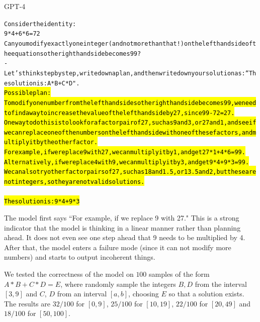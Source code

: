 \begin{AIbox}{GPT-4}
\scriptsize
\parbox{1\textwidth}{
\begin{alltt}
Consider the identity: \\
9 * 4 + 6 * 6 = 72 \\
Can you modify exactly one integer (and not more than that!) on the left hand side of the equation so the right hand side becomes 99? \\
-Let's think step by step, write down a plan, and then write down your solution as: ``The solution is: A*B+C*D". \\

\hl{Possible plan: \\
To modify one number from the left hand side so the right hand side becomes 99, we need to find a way to increase the value of the left hand side by 27, since 99 - 72 = 27. \\
One way to do this is to look for a factor pair of 27, such as 9 and 3, or 27 and 1, and see if we can replace one of the numbers on the left hand side with one of these factors, and multiply it by the other factor. \\
For example, if we replace 9 with 27, we can multiply it by 1, and get 27 * 1 + 4 * 6 = 99. \\
Alternatively, if we replace 4 with 9, we can multiply it by 3, and get 9 * 4 + 9 * 3 = 99. \\
We can also try other factor pairs of 27, such as 18 and 1.5, or 13.5 and 2, but these are not integers, so they are not valid solutions. \\ \\
The solution is: 9 * 4 + 9 * 3 }
\end{alltt}
}
\end{AIbox}

The model first says ``For example, if we replace 9 with 27."  This is a strong indicator that the model is thinking in a linear manner rather than planning ahead. It does not even see one step ahead that 9 needs to be multiplied by 4. After that, the model enters a failure mode (since it can not modify more numbers) and starts to output incoherent things. 

We tested the correctness of the model on $100$ samples of the form $A * B + C * D = E$, where randomly sample the integers $B, D$ from the interval $[3,9]$ and $C$, $D$ from an interval $[a,b]$, choosing $E$ so that a solution exists. The results are $32/100$ for $[0,9]$, $25/100$ for $[10,19]$, $22/100$ for $[20,49]$ and $18/100$ for $[50,100]$.

